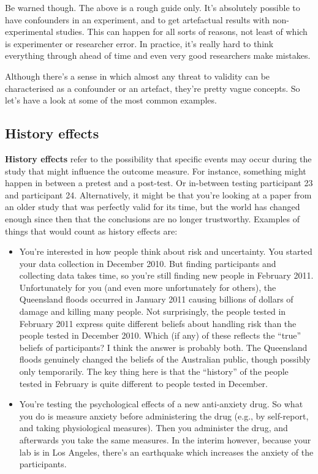\documentclass[
  a4paper,
]{book}
\begin{document}
Be warned though. The above is a rough guide only. It's absolutely
possible to have confounders in an experiment, and to get artefactual
results with non-experimental studies. This can happen for all sorts of
reasons, not least of which is experimenter or researcher error. In
practice, it's really hard to think everything through ahead of time and
even very good researchers make mistakes.

Although there's a sense in which almost any threat to validity can be
characterised as a confounder or an artefact, they're pretty vague
concepts. So let's have a look at some of the most common examples.

\subsection{History effects}\label{history-effects}

\textbf{History effects} refer to the possibility that specific events
may occur during the study that might influence the outcome measure. For
instance, something might happen in between a pretest and a post-test.
Or in-between testing participant 23 and participant 24. Alternatively,
it might be that you're looking at a paper from an older study that was
perfectly valid for its time, but the world has changed enough since
then that the conclusions are no longer trustworthy. Examples of things
that would count as history effects are:

\begin{itemize}
\item
  You're interested in how people think about risk and uncertainty. You
  started your data collection in December 2010. But finding
  participants and collecting data takes time, so you're still finding
  new people in February 2011. Unfortunately for you (and even more
  unfortunately for others), the Queensland floods occurred in January
  2011 causing billions of dollars of damage and killing many people.
  Not surprisingly, the people tested in February 2011 express quite
  different beliefs about handling risk than the people tested in
  December 2010. Which (if any) of these reflects the ``true'' beliefs
  of participants? I think the answer is probably both. The Queensland
  floods genuinely changed the beliefs of the Australian public, though
  possibly only temporarily. The key thing here is that the ``history''
  of the people tested in February is quite different to people tested
  in December.
\item
  You're testing the psychological effects of a new anti-anxiety drug.
  So what you do is measure anxiety before administering the drug (e.g.,
  by self-report, and taking physiological measures). Then you
  administer the drug, and afterwards you take the same measures. In the
  interim however, because your lab is in Los Angeles, there's an
  earthquake which increases the anxiety of the participants.
\end{itemize}
\end{document}
